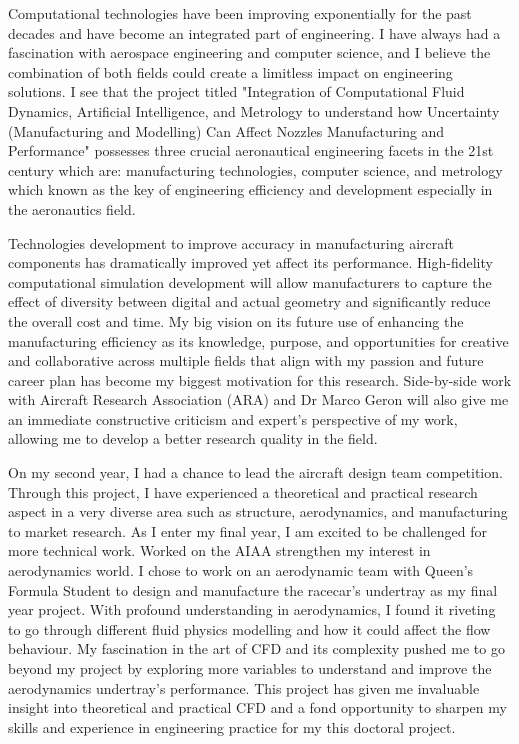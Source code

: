 \vspace{4mm}

Computational technologies have been improving exponentially for the past decades and have become an integrated part of engineering. I have always had a fascination with aerospace engineering and computer science, and I believe the combination of both fields could create a limitless impact on engineering solutions.
I see that the project titled "Integration of Computational Fluid Dynamics, Artificial Intelligence, and Metrology to understand how Uncertainty (Manufacturing and Modelling) Can Affect Nozzles Manufacturing and Performance" possesses three crucial aeronautical engineering facets in the 21st century which are: manufacturing technologies, computer science, and metrology which known as the key of engineering efficiency and development especially in the aeronautics field. 

Technologies development to improve accuracy in manufacturing aircraft components has dramatically improved yet affect its performance. High-fidelity computational simulation development will allow manufacturers to capture the effect of diversity between digital and actual geometry and significantly reduce the overall cost and time. My big vision on its future use of enhancing the manufacturing efficiency as its knowledge, purpose, and opportunities for creative and collaborative across multiple fields that align with my passion and future career plan has become my biggest motivation for this research. Side-by-side work with Aircraft Research Association (ARA) and Dr Marco Geron will also give me an immediate constructive criticism and expert's perspective of my work, allowing me to develop a better research quality in the field.

On my second year, I had a chance to lead the aircraft design team competition. Through this project, I have experienced a theoretical and practical research aspect in a very diverse area such as structure, aerodynamics, and manufacturing to market research. As I enter my final year, I am excited to be challenged for more technical work. Worked on the AIAA strengthen my interest in aerodynamics world. I chose to work on an aerodynamic team with Queen's Formula Student to design and  manufacture the racecar's undertray as my final year project. With profound understanding in aerodynamics, I found it riveting to go through different fluid physics modelling and how it could affect the flow behaviour.  My fascination in the art of CFD and its complexity pushed me to go beyond my project by exploring more variables to understand and improve the aerodynamics undertray's performance. This project has given me invaluable insight into theoretical and practical CFD and a fond opportunity to sharpen my skills and experience in engineering practice for my this doctoral project.


